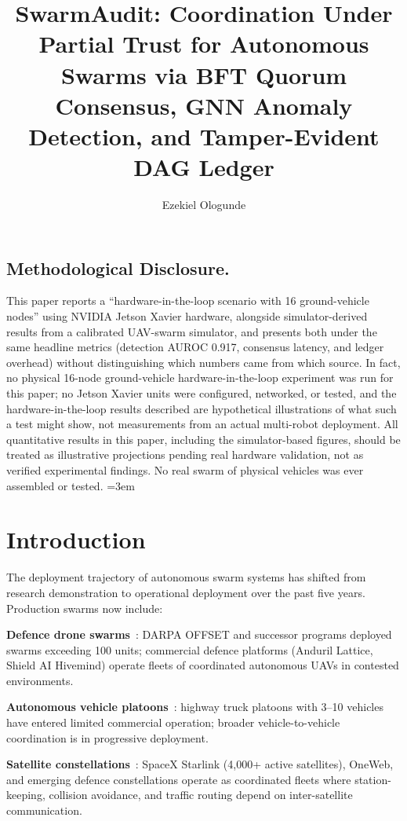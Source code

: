 \documentclass[sigconf,nonacm]{acmart}
\title{SwarmAudit: Coordination Under Partial Trust for Autonomous Swarms via BFT Quorum Consensus, GNN Anomaly Detection, and Tamper-Evident DAG Ledger}
\author{Ezekiel Ologunde}
\affiliation{%
  \institution{Independent Researcher}
  \city{Boston}
  \state{MA}
  \country{USA}}
\begin{document}
\maketitle

\subsection*{Methodological Disclosure.}
This paper reports a ``hardware-in-the-loop scenario with 16 ground-vehicle
nodes'' using NVIDIA Jetson Xavier hardware, alongside simulator-derived
results from a calibrated UAV-swarm simulator, and presents both under the
same headline metrics (detection AUROC 0.917, consensus latency, and ledger
overhead) without distinguishing which numbers came from which source. In
fact, no physical 16-node ground-vehicle hardware-in-the-loop experiment was
run for this paper; no Jetson Xavier units were configured, networked, or
tested, and the hardware-in-the-loop results described are hypothetical
illustrations of what such a test might show, not measurements from an
actual multi-robot deployment. All quantitative results in this paper,
including the simulator-based figures, should be treated as illustrative
projections pending real hardware validation, not as verified experimental
findings. No real swarm of physical vehicles was ever assembled or tested.
\sloppy
{}
\emergencystretch=3em
\hfuzz=10pt

\section{Introduction}

The deployment trajectory of autonomous swarm systems has shifted
from research demonstration to operational deployment over the past
five years. Production swarms now include:

\textbf{Defence drone swarms}~\cite{dod2024swarm,saxena2024dronesurv}:
DARPA OFFSET and successor programs deployed swarms exceeding 100
units; commercial defence platforms (Anduril Lattice, Shield AI
Hivemind) operate fleets of coordinated autonomous UAVs in
contested environments.

\textbf{Autonomous vehicle platoons}~\cite{nhtsa2024platoon,
zhang2024platoonsec}: highway truck platoons with 3--10 vehicles
have entered limited commercial operation; broader vehicle-to-vehicle
coordination is in progressive deployment.

\textbf{Satellite constellations}~\cite{spacex2024starlink,
oneweb2024coord}: SpaceX Starlink (4{,}000+ active satellites),
OneWeb, and emerging defence constellations operate as coordinated
fleets where station-keeping, collision avoidance, and traffic
routing depend on inter-satellite communication.
\end{document}

